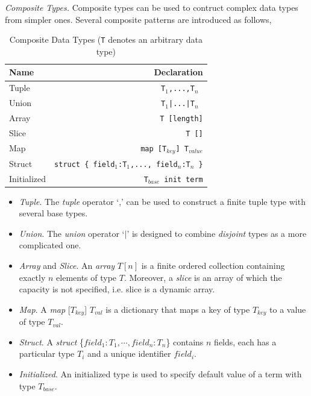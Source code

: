 \noindent\emph{Composite Types.} Composite types can be used to contruct complex data types from simpler ones. Several composite patterns are introduced as follows,

\begin{table}
    \caption{Composite Data Types (\texttt{T} denotes an arbitrary data type)}
    \centering
    \begin{tabular}{lr}
        \hline
        Name & Declaration \T\B \\
        \hline
        \T Tuple  & \texttt{T$_1$,...,T$_n$ }\\
        Union & \texttt{T$_1$|...|T$_n$ } \\
        Array & \texttt{T [length]}\\
        Slice & \texttt{T []} \\
        Map & \texttt{map [T$_{key}$] T$_{value}$} \\
        Struct\hspace{1cm} & \texttt{struct \{ field$_1$:T$_1$,..., field$_n$:T$_n$ \}} \\
        \B Initialized & \texttt{T$_{base}$ init term} \\
        \hline
    \end{tabular}
\end{table}

\begin{itemize}
    \item \emph{Tuple}. The \emph{tuple} operator `,' can be used to construct a finite tuple type with several base types.
    \item \emph{Union}. The \emph{union} operator `$|$' is designed to combine \emph{disjoint} types as a more complicated one. 
    \item \emph{Array} and \emph{Slice}. An \emph{array} $T[n]$ is a finite ordered collection containing exactly $n$ elements of type $T$. Moreover, a \emph{slice} is an array of which the capacity is not specified, i.e. slice is a dynamic array.
    \item \emph{Map}. A \emph{map }[$T_{key}$] $T_{val}$ is a dictionary that maps a key of type $T_{key}$ to a value of type $T_{val}$.
    \item \emph{Struct}. A \emph{struct }\{$field_1:T_1,\cdots,field_n:T_n$\} contains $n$ fields, each has a particular type $T_i$ and a unique identifier $field_i$.
    \item \emph{Initialized}. An initialized type is used to specify default value of a term with type $T_{base}$.
\end{itemize}

